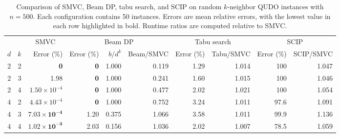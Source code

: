 \documentclass[%
 reprint,
 amsmath,amssymb,
 aps,
 pra,showkeys,
]{revtex4-2}
\begin{document}
\begin{table}[t]
    \centering
    \caption{
    Comparison of SMVC, Beam DP, tabu search, and SCIP on random
    $k$-neighbor QUDO instances with $n=500$. Each configuration
    contains 50 instances. Errors are mean relative errors, with the
    lowest value in each row highlighted in bold. Runtime ratios are
    computed relative to SMVC.
    }
    \label{tab:n500-method-comparison}
    \small
    \setlength{\tabcolsep}{4pt}
    \renewcommand{\arraystretch}{1.15}

    \begin{tabular*}{\textwidth}{
        @{\extracolsep{\fill}}ccrrrrrrrr@{}
    }
        \toprule
        & &
        \multicolumn{1}{c}{SMVC} &
        \multicolumn{3}{c}{Beam DP} &
        \multicolumn{2}{c}{Tabu search} &
        \multicolumn{2}{c}{SCIP} \\
        \cmidrule(lr){3-3}
        \cmidrule(lr){4-6}
        \cmidrule(lr){7-8}
        \cmidrule(l){9-10}

        $d$ & $k$ &
        Error (\%) &
        Error (\%) &
        $b/d^k$ &
        Beam/SMVC &
        Error (\%) &
        Tabu/SMVC &
        Error (\%) &
        SCIP/SMVC \\
        \midrule

        2 & 2 &
        \textbf{0} &
        \textbf{0} &
        1.000 &
        0.119 &
        1.29 &
        1.014 &
        100 &
        1.047 \\

        2 & 3 &
        1.98 &
        \textbf{0} &
        1.000 &
        0.241 &
        1.60 &
        1.015 &
        100 &
        1.046 \\

        2 & 4 &
        $1.50\times10^{-4}$ &
        \textbf{0} &
        1.000 &
        0.477 &
        2.02 &
        1.021 &
        100 &
        1.054 \\

        \midrule

        4 & 2 &
        $4.43\times10^{-4}$ &
        \textbf{0} &
        1.000 &
        0.752 &
        3.24 &
        1.011 &
        97.6 &
        1.091 \\

        4 & 3 &
        $\mathbf{7.03\times10^{-4}}$ &
        1.20 &
        0.375 &
        1.066 &
        3.58 &
        1.011 &
        99.9 &
        1.136 \\

        4 & 4 &
        $\mathbf{1.02\times10^{-3}}$ &
        2.03 &
        0.156 &
        1.036 &
        2.02 &
        1.007 &
        78.5 &
        1.059 \\


\end{tabular*}
\end{table}
\end{document}
